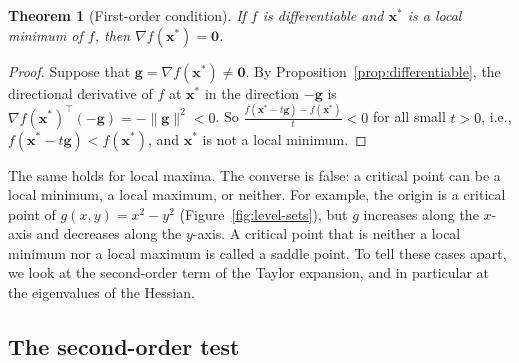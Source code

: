 \documentclass[11pt]{article}
\newcommand{\norm}[1]{\lVert #1 \rVert}
\theoremstyle{definition}
\theoremstyle{plain}
\newtheorem{theorem}[definition]{Theorem}
\theoremstyle{remark}
\begin{document}
\begin{theorem}[First-order condition]\label{thm:first-order}
    If $f$ is differentiable and $\mathbf{x}^*$ is a local minimum of $f$, then $\nabla f(\mathbf{x}^*) = \mathbf{0}$.
\end{theorem}

\begin{proof}
    Suppose that $\mathbf{g} = \nabla f(\mathbf{x}^*) \neq \mathbf{0}$. By Proposition~\ref{prop:differentiable}, the directional derivative of $f$ at $\mathbf{x}^*$ in the direction $-\mathbf{g}$ is $\nabla f(\mathbf{x}^*)^\top(-\mathbf{g}) = -\norm{\mathbf{g}}^2 < 0$. So $\frac{f(\mathbf{x}^* - t\mathbf{g}) - f(\mathbf{x}^*)}{t} < 0$ for all small $t > 0$, i.e., $f(\mathbf{x}^* - t\mathbf{g}) < f(\mathbf{x}^*)$, and $\mathbf{x}^*$ is not a local minimum.
\end{proof}

The same holds for local maxima. The converse is false: a critical point can be a local minimum, a local maximum, or neither. For example, the origin is a critical point of $g(x, y) = x^2 - y^2$ (Figure~\ref{fig:level-sets}), but $g$ increases along the $x$-axis and decreases along the $y$-axis. A critical point that is neither a local minimum nor a local maximum is called a saddle point. To tell these cases apart, we look at the second-order term of the Taylor expansion, and in particular at the eigenvalues of the Hessian.

\subsection{The second-order test}\label{sec:hessian-eigen}
\end{document}
